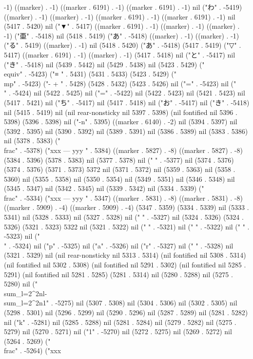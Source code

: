 -1) ((marker) . -1) ((marker . 6191) . -1) ((marker . 6191) . -1) nil ("わ" . -5419) ((marker) . -1) ((marker) . -1) ((marker . 6191) . -1) ((marker . 6191) . -1) nil (5417 . 5420) nil ("▼" . 5417) ((marker . 6191) . -1) ((marker) . -1) ((marker) . -1) ("亜" . -5418) nil (5418 . 5419) ("あ" . -5418) ((marker) . -1) ((marker) . -1) ("る" . 5419) ((marker) . -1) nil (5418 . 5420) ("あ" . -5418) (5417 . 5419) ("▽" . 5417) ((marker . 6191) . -1) ((marker) . -1) (5417 . 5418) nil ("と" . -5417) nil ("き" . -5418) nil (5439 . 5442) nil (5429 . 5438) nil (5423 . 5429) ("\\equiv" . -5423) ("≡
" . 5431) (5431 . 5433) (5423 . 5429) ("\\mp" . -5423) ("-
+
" . 5428) (5428 . 5432) (5423 . 5426) nil ("=" . -5423) nil ("\\" . -5424) nil (5422 . 5425) nil ("=" . -5422) nil (5422 . 5423) nil (5421 . 5423) nil (5417 . 5421) nil ("ち" . -5417) nil (5417 . 5418) nil ("お" . -5417) nil ("き" . -5418) nil (5415 . 5419) nil (nil rear-nonsticky nil 5397 . 5398) (nil fontified nil 5396 . 5398) (5396 . 5398) nil ("-n" . 5395) ((marker . 6140) . -2) nil (5394 . 5397) nil (5392 . 5395) nil (5390 . 5392) nil (5389 . 5391) nil (5386 . 5389) nil (5383 . 5386) nil (5378 . 5383) ("\\frac" . -5378) ("xxx
---
yyy
" . 5384) ((marker . 5827) . -8) ((marker . 5827) . -8) (5384 . 5396) (5378 . 5383) nil (5377 . 5378) nil (" " . -5377) nil (5374 . 5376) (5374 . 5376) (5371 . 5373) 5372 nil (5371 . 5372) nil (5359 . 5363) nil (5358 . 5360) nil (5355 . 5358) nil (5350 . 5354) nil (5349 . 5351) nil (5346 . 5348) nil (5345 . 5347) nil (5342 . 5345) nil (5339 . 5342) nil (5334 . 5339) ("\\frac" . -5334) ("xxx
---
yyy
" . 5347) ((marker . 5831) . -8) ((marker . 5831) . -8) ((marker . 5909) . -4) ((marker . 5909) . -4) (5347 . 5359) (5334 . 5339) nil (5333 . 5341) nil (5328 . 5333) nil (5327 . 5328) nil (" " . -5327) nil (5324 . 5326) (5324 . 5326) (5321 . 5323) 5322 nil (5321 . 5322) nil ("
" . -5321) nil (" " . -5322) nil (" " . -5323) nil ("\\" . -5324) nil ("p" . -5325) nil ("a" . -5326) nil ("r" . -5327) nil (" " . -5328) nil (5321 . 5329) nil (nil rear-nonsticky nil 5313 . 5314) (nil fontified nil 5308 . 5314) (nil fontified nil 5302 . 5308) (nil fontified nil 5291 . 5302) (nil fontified nil 5285 . 5291) (nil fontified nil 5281 . 5285) (5281 . 5314) nil (5280 . 5288) nil (5275 . 5280) nil ("\\sum_{l=2}^{2n}l-\\sum_{l=2}^{2n}1" . -5275) nil (5307 . 5308) nil (5304 . 5306) nil (5302 . 5305) nil (5298 . 5301) nil (5296 . 5299) nil (5290 . 5296) nil (5287 . 5289) nil (5281 . 5282) nil ("k" . -5281) nil (5285 . 5288) nil (5281 . 5284) nil (5279 . 5282) nil (5275 . 5279) nil (5270 . 5271) nil ("1" . -5270) nil (5272 . 5275) nil (5269 . 5272) nil (5264 . 5269) ("\\frac" . -5264) ("xxx
